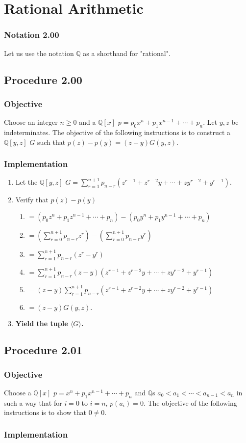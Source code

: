 \documentclass[twocolumn]{article}
\newcommand{\notation}[1]{\subsubsection*{Notation #1}}
\newcommand{\procedure}[2][]{\subsection*{Procedure #2 \ifthenelse{\equal{#1}{}}{}{(#1)}}\label{sec:procedure #2}}
\newcommand{\objective}{\subsubsection*{Objective}}
\newcommand{\implementation}{\subsubsection*{Implementation}}
\begin{document}
	\section{Rational Arithmetic}
		\notation{2.00}
			Let us use the notation $\mathbb{Q}$ as a shorthand for "rational".
		\procedure{2.00}
			\objective
				Choose an integer $n\ge 0$ and a $\mathbb{Q}[x]$ $p=p_0x^n+p_1x^{n-1}+\cdots+p_n$. Let $y,z$ be indeterminates. The objective of the following instructions is to construct a $\mathbb{Q}[y,z]$ $G$ such that $p(z)-p(y)=(z-y)G(y,z)$.
			\implementation
				\begin{enumerate}
					\item Let the $\mathbb{Q}[y,z]$ $G=\sum_{r=1}^{n+1} p_{n-r}(z^{r-1}+z^{r-2}y+\cdots+zy^{r-2}+y^{r-1})$.
					\item Verify that $p(z)-p(y)$
					\begin{enumerate}
						\item $=(p_0z^n+p_1z^{n-1}+\cdots+p_n)-(p_0y^n+p_1y^{n-1}+\cdots+p_n)$
						\item $=(\sum_{r=0}^{n+1} p_{n-r}z^r)-(\sum_{r=0}^{n+1} p_{n-r}y^r)$
						\item $=\sum_{r=1}^{n+1} p_{n-r}(z^r-y^r)$
						\item $=\sum_{r=1}^{n+1} p_{n-r}(z-y)(z^{r-1}+z^{r-2}y+\cdots+zy^{r-2}+y^{r-1})$
						\item $=(z-y)\sum_{r=1}^{n+1} p_{n-r}(z^{r-1}+z^{r-2}y+\cdots+zy^{r-2}+y^{r-1})$
						\item $=(z-y)G(y,z)$.
					\end{enumerate}
					\item \textbf{Yield the tuple $\langle G\rangle$.}
				\end{enumerate}
		\procedure{2.01}
			\objective
				Choose a $\mathbb{Q}[x]$ $p=x^n+p_1x^{n-1}+\cdots+p_n$ and $\mathbb{Q}$s $a_0<a_1<\cdots<a_{n-1}<a_{n}$ in such a way that for $i=0$ to $i=n$, $p(a_i)=0$. The objective of the following instructions is to show that $0\ne 0$.
			\implementation
\end{document}
